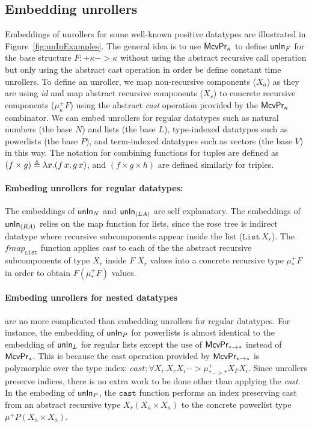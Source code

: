 \subsection{Embedding unrollers}
\label{sec:fixi:cv:unInExamples}
Embeddings of unrollers for some well-known positive datatypes
are illustrated in Figure~\ref{fig:unInExamples}. The general idea is to
use $\mathsf{McvPr}_\kappa$ to define $\mathsf{unIn}_F$ for the base structure
$F:+\kappa -> \kappa$ without using the abstract recursive call operation
but only using the abstract cast operation in order be define constant
time unrollers. To define an unroller, we map non-recursive
components ($X_a$) as they are using \textit{id} and map abstract recursive
components ($X_r$) to concrete recursive components
($\mu^{+}_\kappa F$) using the abstract \textit{cast} operation provided
by the $\mathsf{McvPr}_\kappa$ combinator. We can embed unrollers
for regular datatypes such as natural numbers (the base $N$) and lists
(the base $L$), type-indexed datatypes such as powerlists (the base $P$),
and term-indexed datatypes such as vectors (the base $V$) in this way.
The notation for combining functions for tuples are defined as
$(f \times g) \triangleq \lambda x.(f\,x,g\,x)$, and $(f\times g\times h)$
are defined similarly for triples.

\paragraph{Embeding unrollers for regular datatypes:}
The embeddings of $\mathsf{unIn}_N$ and $\mathsf{unIn}_{(L A)}$ are self explanatory.
The embeddings of $\mathsf{unIn}_{(R A)}$ relies on the map function for lists,
since the rose tree is indirect datatype where recursive subcomponents
appear inside the list ($\texttt{List}\,X_r$).
The $\textit{fmap}_\texttt{List}$ function applies \textit{cast} to each of
the the abstract recursive subcomponents of type $X_r$ inside $F\;X_r$
values into a concrete recursive type $\mu_{*}^{+}F$ in order to obtain
$F(\mu_{*}^{+}F)$ values.

\paragraph{Embeding unrollers for nested datatypes} are no more complicated
than embedding unrollers for regular datatypes. For instance, the embedding
of $\mathsf{unIn}_P$ for powerlists is almost identical to the embedding of $\mathsf{unIn}_L$
for regular lists except the use of $\mathsf{McvPr}_{* -> *}$ instead of $\mathsf{McvPr}_{*}$.
This is because the cast operation provided by $\mathsf{McvPr}_{* -> *}$ is polymorphic
over the type index:
$\textit{cast}:\forall X_i. X_r X_i -> \mu^{+}_{* -> *} X_F X_i$.
Since unrollers preserve indices, there is no extra work to be done
other than applying the \textit{cast}. In the embeding of $\mathsf{unIn}_P$,
the $\texttt{cast}$ function performs an index preserving cast from
an abstract recursive type $X_r (X_a\times X_a)$ to the concrete powerlist type 
$\mu^{+}P (X_a\times X_a)$.

